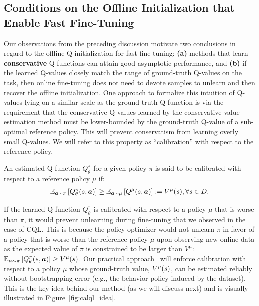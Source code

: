 \vspace{-0.1cm}
\subsection{Conditions on the Offline Initialization that Enable Fast Fine-Tuning}
\vspace{-0.18cm}
Our observations from the preceding discussion motivate two conclusions in regard to the offline Q-initialization for fast fine-tuning: \textbf{(a)} methods that learn \textbf{conservative} Q-functions can attain good asymptotic performance, and \textbf{(b)} if the learned Q-values closely match the range of ground-truth Q-values on the task, then online fine-tuning does not need to devote samples to unlearn and then recover the offline initialization. One approach to formalize this intuition of Q-values lying on a similar scale as the ground-truth Q-function is via the requirement that the conservative Q-values learned by the conservative value estimation method must be lower-bounded by the ground-truth Q-value of a sub-optimal reference policy. This will prevent conservatism from learning overly small Q-values. We will refer to this property as ``calibration'' with respect to the reference policy.
\begin{tcolorbox}[colback=blue!6!white,colframe=black,boxsep=0pt,top=-3pt,bottom=2pt]
\vspace{2mm}
\begin{definition}[Calibration]
\label{cond:calibration}
An estimated Q-function ${Q}_\theta^\pi$ for a given policy $\pi$ is said to be calibrated with respect to a reference policy $\mu$ if:
\begin{align} 
    \mathbb{E}_{\boldsymbol{a} \sim \pi}\left[Q_\theta^\pi(s, \boldsymbol{a})\right] \geq \mathbb{E}_{\boldsymbol{a} \sim \mu}\left[Q^\mu(s, \boldsymbol{a})\right] := V^\mu(s), \forall s \in \mathcal \mathcal{D}.
\end{align}
\end{definition}
\end{tcolorbox}

If the learned Q-function ${Q}^\pi_\theta$ is calibrated with respect to a policy $\mu$ that is worse than $\pi$, it would prevent unlearning during fine-tuning that we observed in the case of CQL.
This is because the policy optimizer would not unlearn $\pi$ in favor of a policy that is worse than the reference policy $\mu$ upon observing new online data as the expected value of $\pi$ is constrained to be larger than $V^\mu$: $\mathbb{E}_{\boldsymbol{a} \sim \pi}\left[{Q}^\pi_\theta(s, \boldsymbol{a})\right] \geq V^\mu(s)$.
Our practical approach \methodname\ will enforce calibration with respect to a policy $\mu$ whose ground-truth value, $V^\mu(s)$, can be estimated reliably without bootstrapping error (e.g., the behavior policy induced by the dataset). This is the key idea behind our method (as we will discuss next) and is visually illustrated in Figure~\ref{fig:calql_idea}.

\vspace{-0.2cm}
